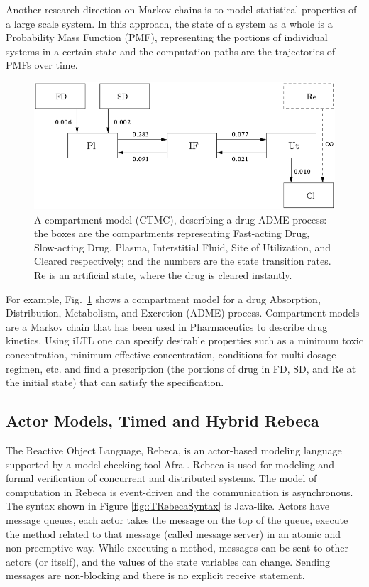 \documentclass[
graybox,
envcountchap
]{svmult}
\begin{document}
\begin{bibunit}
Another research direction on Markov chains is to model statistical properties of a large scale system. In this approach, the state of a system as a whole is a Probability Mass Function (PMF), representing the portions of individual systems in a certain state and the computation paths are the trajectories of PMFs over time.

\begin{figure}
\centering
\includegraphics[width=.6\columnwidth]{assets/compartment_model.png}
\caption{
    A compartment model (CTMC), describing a drug ADME process: the boxes are the compartments representing Fast-acting Drug, Slow-acting Drug, Plasma, Interstitial Fluid, Site of Utilization, and Cleared respectively; and the numbers are the state transition rates. Re is an artificial state, where the drug is cleared instantly.}
\label{fig:comparment}
\end{figure}

For example, Fig.~\ref{fig:comparment} shows a compartment model for a drug Absorption, Distribution, Metabolism, and Excretion (ADME) process. Compartment models are a Markov chain that has been used in Pharmaceutics to describe drug kinetics. Using iLTL one can specify desirable properties such as a minimum toxic concentration, minimum effective concentration, conditions for multi-dosage regimen, etc. and find a prescription (the portions of drug in FD, SD, and Re at the initial state) that can satisfy the specification.



\subsection{Actor Models,  Timed and Hybrid Rebeca}
The Reactive Object Language, Rebeca, is an actor-based modeling language  supported by a model checking tool Afra \cite{DBLP:journals/fuin/SirjaniMSB04,DBLP:conf/birthday/SirjaniJ11}.
Rebeca is used for modeling and formal verification of concurrent and distributed systems.
The model of computation in  Rebeca is event-driven and the communication is asynchronous.
The syntax shown in Figure \ref{fig::TRebecaSyntax} is Java-like. 
Actors have message queues, each actor takes the message on the top of the queue, execute the method related to that message (called message server) in an atomic and non-preemptive way. While executing a method, messages can be sent to other actors (or itself), and the values of the state variables can change. Sending messages are non-blocking and there is no explicit receive statement.


\end{bibunit}
\end{document}
